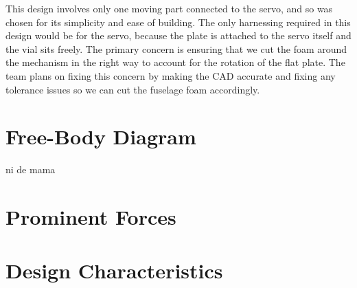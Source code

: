     This design involves only one moving part connected to the servo, and so was chosen for its simplicity and ease of building. The only harnessing required in this design would be for the servo, because the plate is attached to the servo itself and the vial sits freely. The primary concern is ensuring that we cut the foam around the mechanism in the right way to account for the rotation of the flat plate. The team plans on fixing this concern by making the CAD accurate and fixing any tolerance issues so we can cut the fuselage foam accordingly.
    
\section{Free-Body Diagram}
    
    ni de mama

\section{Prominent Forces}

\section{Design Characteristics}

